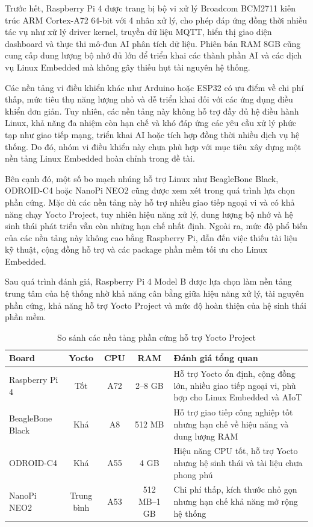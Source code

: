 Trước hết, Raspberry Pi 4 được trang bị bộ vi xử lý Broadcom BCM2711 kiến trúc ARM Cortex-A72 64-bit với 4 nhân xử lý, cho phép đáp ứng đồng thời nhiều tác vụ như xử lý driver kernel, truyền dữ liệu MQTT, hiển thị giao diện dashboard và thực thi mô-đun AI phân tích dữ liệu. Phiên bản RAM 8GB cũng cung cấp dung lượng bộ nhớ đủ lớn để triển khai các thành phần AI và các dịch vụ Linux Embedded mà không gây thiếu hụt tài nguyên hệ thống.

Các nền tảng vi điều khiển khác như Arduino hoặc ESP32 có ưu điểm về chi phí thấp, mức tiêu thụ năng lượng nhỏ và dễ triển khai đối với các ứng dụng điều khiển đơn giản. Tuy nhiên, các nền tảng này không hỗ trợ đầy đủ hệ điều hành Linux, khả năng đa nhiệm còn hạn chế và khó đáp ứng các yêu cầu xử lý phức tạp như giao tiếp mạng, triển khai AI hoặc tích hợp đồng thời nhiều dịch vụ hệ thống. Do đó, nhóm vi điều khiển này chưa phù hợp với mục tiêu xây dựng một nền tảng Linux Embedded hoàn chỉnh trong đề tài.

Bên cạnh đó, một số bo mạch nhúng hỗ trợ Linux như BeagleBone Black, ODROID-C4 hoặc NanoPi NEO2 cũng được xem xét trong quá trình lựa chọn phần cứng. Mặc dù các nền tảng này hỗ trợ nhiều giao tiếp ngoại vi và có khả năng chạy Yocto Project, tuy nhiên hiệu năng xử lý, dung lượng bộ nhớ và hệ sinh thái phát triển vẫn còn những hạn chế nhất định. Ngoài ra, mức độ phổ biến của các nền tảng này không cao bằng Raspberry Pi, dẫn đến việc thiếu tài liệu kỹ thuật, cộng đồng hỗ trợ và các package phần mềm tối ưu cho Linux Embedded.

Sau quá trình đánh giá, Raspberry Pi 4 Model B được lựa chọn làm nền tảng trung tâm của hệ thống nhờ khả năng cân bằng giữa hiệu năng xử lý, tài nguyên phần cứng, khả năng hỗ trợ Yocto Project và mức độ hoàn thiện của hệ sinh thái phần mềm. 

\begin{table}[H]
\centering 
\caption{So sánh các nền tảng phần cứng hỗ trợ Yocto Project}
\renewcommand{\arraystretch}{1.4}
\begin{tabularx}{\textwidth}{|l|c|c|c|>{\raggedright\arraybackslash}X|}
\hline
\textbf{Board} & \textbf{Yocto} & \textbf{CPU} & \textbf{RAM} & \textbf{Đánh giá tổng quan} \\
\hline
Raspberry Pi 4 & Tốt & A72 & 2--8 GB & Hỗ trợ Yocto ổn định, cộng đồng lớn, nhiều giao tiếp ngoại vi, phù hợp cho Linux Embedded và AIoT \\
\hline
BeagleBone Black & Khá & A8 & 512 MB & Hỗ trợ giao tiếp công nghiệp tốt nhưng hạn chế về hiệu năng và dung lượng RAM \\
\hline
ODROID-C4 & Khá & A55 & 4 GB & Hiệu năng CPU tốt, hỗ trợ Yocto nhưng hệ sinh thái và tài liệu chưa phong phú \\
\hline
NanoPi NEO2 & Trung bình & A53 & 512 MB--1 GB & Chi phí thấp, kích thước nhỏ gọn nhưng hạn chế khả năng mở rộng hệ thống \\
\hline
\end{tabularx}
\end{table}

